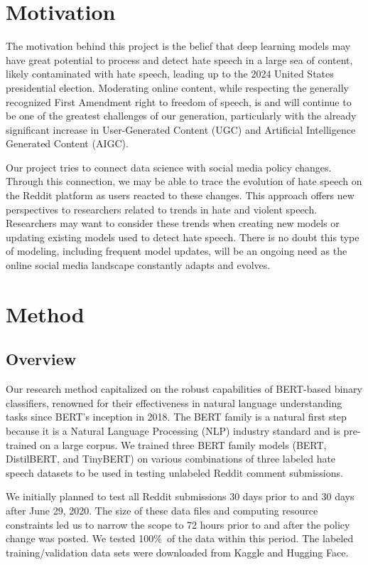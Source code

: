 \documentclass[conference]{IEEEtran}
\begin{document}
\section{Motivation}
The motivation behind this project is the belief that deep learning models may have great potential to process and detect hate speech in a large sea of content, likely contaminated with hate speech, leading up to the 2024 United States presidential election. Moderating online content, while respecting the generally recognized First Amendment right to freedom of speech, is and will continue to be one of the greatest challenges of our generation, particularly with the already significant increase in User-Generated Content (UGC) and Artificial Intelligence Generated Content (AIGC).

Our project tries to connect data science with social media policy changes. Through this connection, we may be able to trace the evolution of hate speech on the Reddit platform as users reacted to these changes. This approach offers new perspectives to researchers related to trends in hate and violent speech. Researchers may want to consider these trends when creating new models or updating existing models used to detect hate speech. There is no doubt this type of modeling, including frequent model updates, will be an ongoing need as the online social media landscape constantly adapts and evolves.

\section{Method}

\subsection{Overview}
Our research method capitalized on the robust capabilities of BERT-based binary classifiers, renowned for their effectiveness in natural language understanding tasks since BERT's inception in 2018\cite{b7}. The BERT family is a natural first step because it is a Natural Language Processing (NLP) industry standard and is pre-trained on a large corpus. We trained three BERT family models (BERT, DistilBERT, and TinyBERT) on various combinations of three labeled hate speech datasets to be used in testing unlabeled Reddit comment submissions. 

We initially planned to test all Reddit submissions 30 days prior to and 30 days after June 29, 2020. The size of these data files and computing resource constraints led us to narrow the scope to 72 hours prior to and after the policy change was posted. We tested 100\%\ of the data within this period. The labeled training/validation data sets were downloaded from Kaggle\cite{b8} and Hugging Face\cite{b9}. 
\end{document}
